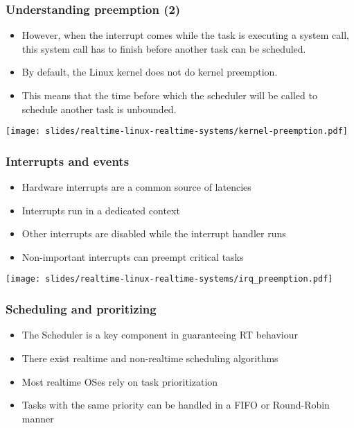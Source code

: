 \begin{frame}
  \frametitle{Understanding preemption (2)}
  \begin{itemize}
  \item However, when the interrupt comes while the task is executing
    a system call, this system call has to finish before another task
    can be scheduled.
  \item By default, the Linux kernel does not do kernel preemption.
  \item This means that the time before which the scheduler will be
    called to schedule another task is unbounded.
  \end{itemize}
  \begin{center}
    \texttt{[image: slides/realtime-linux-realtime-systems/kernel-preemption.pdf]}
  \end{center}
\end{frame}


\begin{frame}
  \frametitle{Interrupts and events}
        \begin{itemize}
                \item Hardware interrupts are a common source of latencies
                \item Interrupts run in a dedicated context
                \item Other interrupts are disabled while the interrupt handler runs
                \item Non-important interrupts can preempt critical tasks
        \end{itemize}
        \texttt{[image: slides/realtime-linux-realtime-systems/irq\_preemption.pdf]}
\end{frame}

\begin{frame}
  \frametitle{Scheduling and proritizing}
        \begin{itemize}
                \item The Scheduler is a key component in guaranteeing RT behaviour
                \item There exist realtime and non-realtime scheduling algorithms
                \item Most realtime OSes rely on task prioritization
                \item Tasks with the same priority can be handled in a FIFO or Round-Robin manner
        \end{itemize}
\end{frame}

